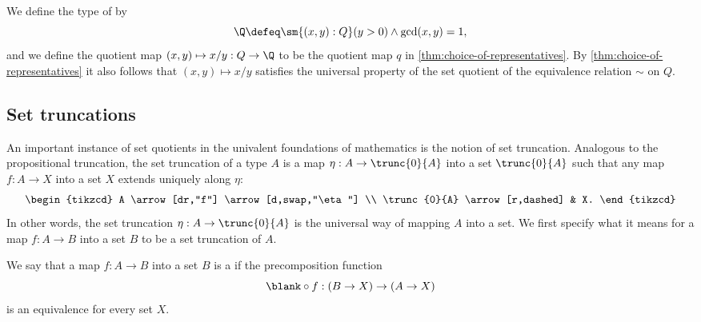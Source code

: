 \begin{eg}
  We define the type of  by
  \begin{equation*}
    \Q\defeq \sm{(x,y):Q}(y>0)\land \gcd(x,y)=1,
  \end{equation*}
  and we define the quotient map $(x,y)\mapsto x/y:Q\to \Q$ to be the quotient map $q$ in \cref{thm:choice-of-representatives}. By \cref{thm:choice-of-representatives} it also follows that $(x,y)\mapsto x/y$ satisfies the universal property of the set quotient of the equivalence relation $\sim$ on $Q$.
\end{eg}

\subsection{Set truncations}

An important instance of set quotients in the univalent foundations of mathematics is the notion of set truncation. Analogous to the propositional truncation, the set truncation of a type $A$ is a map $\eta:A\to \trunc{0}{A}$ into a set $\trunc{0}{A}$ such that any map $f:A\to X$ into a set $X$ extends uniquely along $\eta$:
\begin{equation*}
  \begin{tikzcd}
    A \arrow[dr,"f"] \arrow[d,swap,"\eta"] \\
    \trunc{0}{A} \arrow[r,dashed] & X.
  \end{tikzcd}
\end{equation*}
In other words, the set truncation $\eta:A\to\trunc{0}{A}$ is the universal way of mapping $A$ into a set. We first specify what it means for a map $f:A\to B$ into a set $B$ to be a set truncation of $A$.

\begin{defn}
  We say that a map $f:A\to B$ into a set $B$ is a  if the precomposition function
  \begin{equation*}
    \blank\circ f : (B\to X)\to (A\to X)
  \end{equation*}
  is an equivalence for every set $X$. 
\end{defn}

